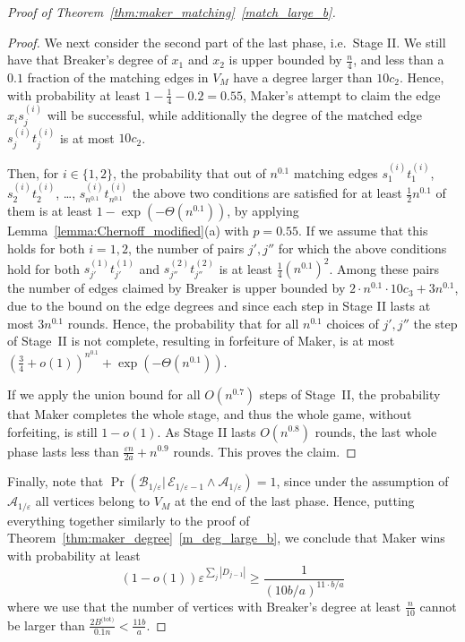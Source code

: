 \documentclass[11pt, a4paper]{article}
\numberwithin{equation}{section}
\numberwithin{figure}{section}
\newcommand{\eps}{\varepsilon}
\begin{document}
\begin{proof}[Proof of Theorem~\ref{thm:maker_matching}~\ref{match_large_b}]
\begin{proof}
We next consider the second part of the last phase, i.e.~Stage II.
We still have that Breaker's degree of $x_1$ and $x_2$ is upper bounded by $\frac{n}{4}$, and less than a $0.1$ fraction of the matching edges in $V_M$ have a degree larger than $10 c_2$. Hence, with probability at least $1-\frac{1}{4}-0.2 = 0.55$, Maker's attempt to claim the edge $x_i s^{(i)}_j$ will be successful, while additionally the degree of the matched edge $s^{(i)}_j t^{(i)}_j$ is at most $10 c_2$.

Then, for $i \in \{1,2 \}$, the probability that out of $n^{0.1}$ matching edges $s^{(i)}_1 t^{(i)}_1$, $s^{(i)}_2 t^{(i)}_2$, \dots, $s^{(i)}_{n^{0.1}} t^{(i)}_{n^{0.1}}$ the above two conditions are satisfied for at least $\frac12 n^{0.1}$ of them 
is at least $1- \exp(- \Theta(n^{0.1}))$, by applying Lemma~\ref{lemma:Chernoff_modified}(a) with $p=0.55$.
If we assume that this holds for both $i=1,2$, the number of pairs $j', j''$ for which the above conditions hold for both $s^{(1)}_{j'} t^{(1)}_{j'}$ and $s^{(2)}_{j''}t^{(2)}_{j''}$ is at least $\frac14  \left(
n^{0.1} \right)^2$. Among these pairs the number of edges claimed by Breaker is upper bounded by $2\cdot n^{0.1}\cdot 10c_3 + 3n^{0.1}$, due to the bound on the edge degrees and since each step in Stage II lasts at most $3n^{0.1}$ rounds. Hence, the probability that for all $n^{0.1}$ choices of $j', j''$ the step of Stage~II is not complete, resulting in forfeiture of Maker, is at most $\left( \frac34 + o(1) \right)^{n^{0.1}} + \exp(- \Theta(n^{0.1}))$. 

If we apply the union bound for all $O(n^{0.7})$ steps of Stage~II, the probability that Maker completes the whole stage, and thus the whole game, without forfeiting, is still $1-o(1)$. As Stage II lasts $O(n^{0.8})$ rounds, the last whole phase lasts less than 
$\frac{\varepsilon n}{2a} + n^{0.9}$ rounds.
This proves the claim.
\end{proof}

Finally, note that $\operatorname{Pr}(\mathcal{B}_{1/\varepsilon}|\, \mathcal{E}_{1/\varepsilon-1} \land \mathcal{A}_{1/\varepsilon}) = 1$, since
under the assumption of $\mathcal{A}_{1/\varepsilon}$ all vertices belong to $V_M$ at the end of the last phase. Hence, putting everything together similarly to the proof of Theorem~\ref{thm:maker_degree}~\ref{m_deg_large_b}, we conclude that Maker wins with probability at least
$$
(1-o(1))\eps^{\sum_j |D_{j-1}|} 
\geq \frac{1}{(10b/a)^{11\cdot b/a}}
$$
where we use that the number of vertices with Breaker's degree at least $\frac{n}{10}$ cannot be larger than $\frac{2 B^{\text{(tot)}}}{0.1n} < \frac{11b}{a}$.
\end{proof}
\end{document}
